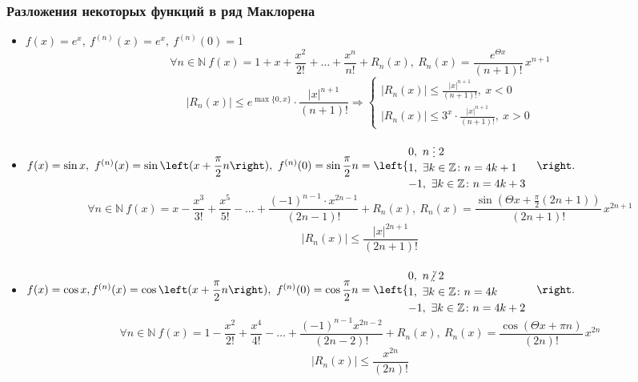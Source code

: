 \subsubsection{Разложения некоторых функций в ряд Маклорена}
\begin{itemize}
	\item $f(x) = e^x, \
	f^{(n)}(x) = e^x, \
	f^{(n)}(0) = 1$
	\begin{equation*}
	\forall n \in \mathbb N \ f(x) = 1 + x + \frac{x^2}{2!} + \ldots + \frac{x^n}{n!} + R_n(x), \
	R_n(x) = \frac{e^{\Theta x}}{(n + 1)!}\,x^{n + 1}
	\end{equation*}
	\begin{equation*}
	|R_n(x)| \leqslant e^{\max \{ 0, x \}} \cdot \frac{|x|^{n + 1}}{(n + 1)!} \Rightarrow
	\begin{cases}
	\displaystyle |R_n(x)| \leqslant \frac{|x|^{n + 1}}{(n + 1)!}, \ x < 0 \\
	\displaystyle |R_n(x)| \leqslant 3^x \cdot \frac{|x|^{n + 1}}{(n + 1)!}, \ x > 0
	\end{cases}
	\end{equation*}
	
	\item $f(x) = \sin x, \
	f^{(n)}(x) = \sin \left( x + \dfrac\pi{2} n \right), \
	f^{(n)}(0) = \sin \dfrac\pi{2} n =
	\begin{cases}
	0, \ n \mult 2 \\
	1, \ \exists k \in \mathbb Z \colon n = 4k + 1 \\
	-1, \ \exists k \in \mathbb Z \colon n = 4k + 3
	\end{cases}$
	\begin{equation*}
	\forall n \in \mathbb N \ f(x) = x - \frac{x^3}{3!} + \frac{x^5}{5!} - \ldots + \frac{(-1)^{n-1} \cdot x^{2n-1}}{(2n - 1)!} + R_n(x), \
	R_n(x) = \frac{\sin \left( \Theta x + \frac\pi2 (2n + 1) \right)}{(2n + 1)!}\,x^{2n+1}
	\end{equation*}
	\begin{equation*}
	|R_n(x)| \leqslant \frac{|x|^{2n+1}}{(2n + 1)!}
	\end{equation*}
	
	\item $f(x) = \cos x,
	f^{(n)}(x) = \cos \left( x + \dfrac\pi{2} n \right), \
	f^{(n)}(0) = \cos \dfrac\pi{2} n =
	\begin{cases}
	0, \ n \notmult 2 \\
	1, \ \exists k \in \mathbb Z \colon n = 4k \\
	-1, \ \exists k \in \mathbb Z \colon n = 4k + 2
	\end{cases}$
	\begin{equation*}
	\forall n \in \mathbb N \ f(x) = 1 - \frac{x^2}{2!} + \frac{x^4}{4!} - \ldots + \frac{(-1)^{n-1} x^{2n-2}}{(2n - 2)!} + R_n(x), \
	R_n(x) = \frac{\cos (\Theta x + \pi n)}{(2n)!}\,x^{2n}
	\end{equation*}
	\begin{equation*}
	|R_n(x)| \leqslant \frac{x^{2n}}{(2n)!}
	\end{equation*}
	

\end{itemize}
